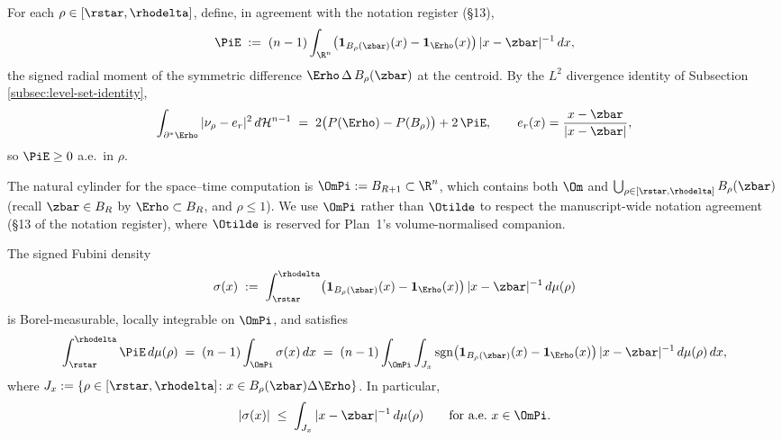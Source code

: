 For each $\rho\in[\rstar,\rhodelta]$, define, in agreement with the
notation register (§13),
\begin{equation}\label{eq:Pi-def}
   \PiE
   \;:=\;
   (n-1)\int_{\R^{n}}
   \bigl(\mathbf{1}_{B_{\rho}(\zbar)}(x)-\mathbf{1}_{\Erho}(x)\bigr)\,
   |x-\zbar|^{-1}\,dx,
\end{equation}
the signed radial moment of the symmetric difference
$\Erho\,\Delta\,B_{\rho}(\zbar)$ at the centroid. By the
$L^{2}$ divergence identity of
Subsection \ref{subsec:level-set-identity},
\begin{equation}\label{eq:53prime}
   \int_{\partial^{*}\Erho}|\nu_{\rho}-e_{r}|^{2}\,d\mathcal H^{n-1}
   \;=\;
   2\bigl(P(\Erho)-P(B_{\rho})\bigr)+2\,\PiE,
   \qquad e_{r}(x)=\frac{x-\zbar}{|x-\zbar|},
\end{equation}
so $\PiE\ge 0$ a.e.\ in $\rho$.

The natural cylinder for the space--time computation is
$\OmPi:=B_{R+1}\subset\R^{n}$, which contains both $\Om$ and
$\bigcup_{\rho\in[\rstar,\rhodelta]}B_{\rho}(\zbar)$ (recall
$\zbar\in B_{R}$ by $\Erho\subset B_{R}$, and $\rho\le 1$). We use
$\OmPi$ rather than $\Otilde$ to respect the manuscript-wide notation
agreement (§13 of the notation register), where $\Otilde$ is reserved
for Plan~1's volume-normalised companion.

\begin{theorem}\label{thm:G1}
The signed Fubini density
\begin{equation}\label{eq:sigma-def}
   \sigma(x)
   \;:=\;
   \int_{\rstar}^{\rhodelta}
   \bigl(\mathbf{1}_{B_{\rho}(\zbar)}(x)-\mathbf{1}_{\Erho}(x)\bigr)\,
   |x-\zbar|^{-1}\,d\mu(\rho)
\end{equation}
is Borel-measurable, locally integrable on $\OmPi$, and satisfies
\begin{equation}\label{eq:spacetime-Pi}
   \int_{\rstar}^{\rhodelta}\PiE\,d\mu(\rho)
   \;=\;
   (n-1)\int_{\OmPi}\sigma(x)\,dx
   \;=\;
   (n-1)\int_{\OmPi}\int_{J_{x}}
   \mathrm{sgn}\bigl(\mathbf{1}_{B_{\rho}(\zbar)}(x)-\mathbf{1}_{\Erho}(x)\bigr)
   \,|x-\zbar|^{-1}\,d\mu(\rho)\,dx,
\end{equation}
where $J_{x}:=\{\rho\in[\rstar,\rhodelta]\colon
x\in B_{\rho}(\zbar)\Delta\Erho\}$. In particular,
\begin{equation}\label{eq:sigma-pointwise}
   |\sigma(x)|
   \;\le\;
   \int_{J_{x}}|x-\zbar|^{-1}\,d\mu(\rho)
   \qquad\text{for a.e.\ }x\in\OmPi.
\end{equation}
\end{theorem}

